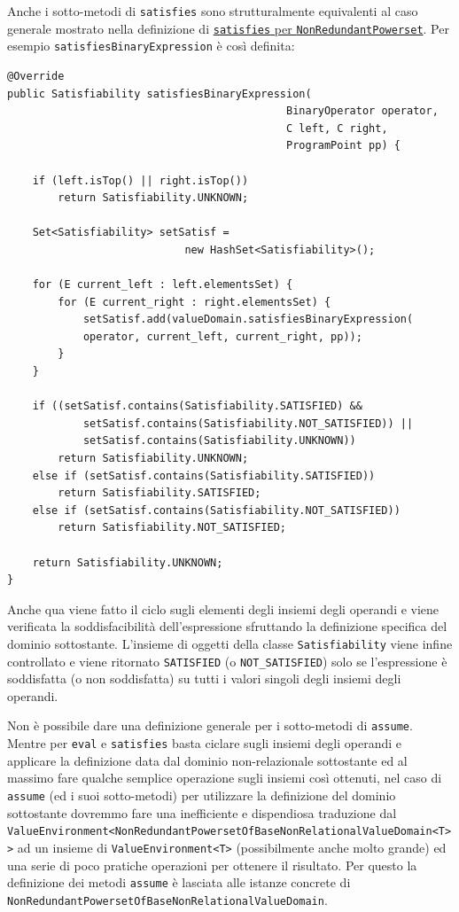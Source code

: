 Anche i sotto-metodi di \texttt{satisfies} sono strutturalmente equivalenti al caso generale mostrato nella definizione di \hyperref[code:satisfiesPowersetGeneral]{\texttt{satisfies} per \texttt{NonRedundantPowerset}}. Per esempio \texttt{satisfiesBinaryExpression} è così definita:  
\begin{lstlisting}[belowskip=-1.1 \baselineskip]
@Override
public Satisfiability satisfiesBinaryExpression(
                                            BinaryOperator operator, 
                                            C left, C right, 
                                            ProgramPoint pp) {

    if (left.isTop() || right.isTop())
        return Satisfiability.UNKNOWN;

    Set<Satisfiability> setSatisf = 
                            new HashSet<Satisfiability>();
                            
    for (E current_left : left.elementsSet) {
        for (E current_right : right.elementsSet) {
            setSatisf.add(valueDomain.satisfiesBinaryExpression(
            operator, current_left, current_right, pp));
        }
    }
    
    if ((setSatisf.contains(Satisfiability.SATISFIED) && 
            setSatisf.contains(Satisfiability.NOT_SATISFIED)) ||
            setSatisf.contains(Satisfiability.UNKNOWN))
        return Satisfiability.UNKNOWN;
    else if (setSatisf.contains(Satisfiability.SATISFIED))
        return Satisfiability.SATISFIED;
    else if (setSatisf.contains(Satisfiability.NOT_SATISFIED))
        return Satisfiability.NOT_SATISFIED;

    return Satisfiability.UNKNOWN;
}
\end{lstlisting}
Anche qua viene fatto il ciclo sugli elementi degli insiemi degli operandi e viene verificata la soddisfacibilità dell'espressione sfruttando la definizione specifica del dominio sottostante. L'insieme di oggetti della classe \texttt{Satisfiability} viene infine controllato e viene ritornato \texttt{SATISFIED} (o \texttt{NOT\_SATISFIED}) solo se l'espressione è soddisfatta (o non soddisfatta) su tutti i valori singoli degli insiemi degli operandi. 

Non è possibile dare una definizione generale per i sotto-metodi di \texttt{assume}. Mentre per \texttt{eval} e \texttt{satisfies} basta ciclare sugli insiemi degli operandi e applicare la definizione data dal dominio non-relazionale sottostante ed al massimo fare qualche semplice operazione sugli insiemi così ottenuti, nel caso di \texttt{assume} (ed i suoi sotto-metodi) per utilizzare la definizione del dominio sottostante dovremmo fare una inefficiente e dispendiosa traduzione dal \texttt{ValueEnvironment<NonRedundantPowersetOfBaseNonRelationalValueDomain<T>>} ad un insieme di \texttt{ValueEnvironment<T>} (possibilmente anche molto grande) ed una serie di poco pratiche operazioni per ottenere il risultato. Per questo la definizione dei metodi \texttt{assume} è lasciata alle istanze concrete di \texttt{NonRedundantPowersetOfBaseNonRelationalValueDomain}.

